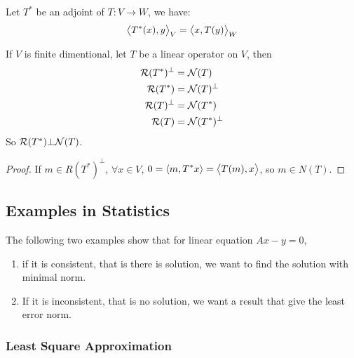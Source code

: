 \begin{theorem}
    Let $T^*$ be an adjoint of $T: V \rightarrow W$, we have:
    \begin{equation}
        \left\langle \displaystyle T^*(x), y \right\rangle_V = \left\langle \displaystyle x, T(y) \right\rangle_W
    \end{equation}
\end{theorem}



\begin{theorem}\label{nullandreciprocaladjoint}
    If $V$ is finite dimentional, let $T$ be a linear operator on $V$, then
    \begin{equation*}
        \begin{aligned}
            \mathcal{R}(T^*)^\bot &= \mathcal{N}(T)\\
            \mathcal{R}(T^*) &= \mathcal{N}(T)^\bot \\
            \mathcal{R}(T)^\bot &= \mathcal{N}(T^*)\\
            \mathcal{R}(T) &= \mathcal{N}(T^*)^\bot
        \end{aligned}
    \end{equation*}
    So $\mathcal{R}(T^*) \bot \mathcal{N}(T)$.
\end{theorem}
\begin{proof}
    If $m \in R(T^*)^\bot$, $\forall x \in V$, $0 = \left\langle \displaystyle m, T^*x \right\rangle = \left\langle \displaystyle T(m), x \right\rangle$, so $m \in N(T)$.
\end{proof}



\subsection{Examples in Statistics}

The following two examples show that for linear equation $Ax - y = 0$, 
\begin{enumerate}
    \item if it is consistent, that is there is solution, we want to find the solution with minimal norm.
    \item If it is inconsistent, that is no solution, we want a result that give the least error norm.
\end{enumerate}


\subsubsection{Least Square Approximation}

